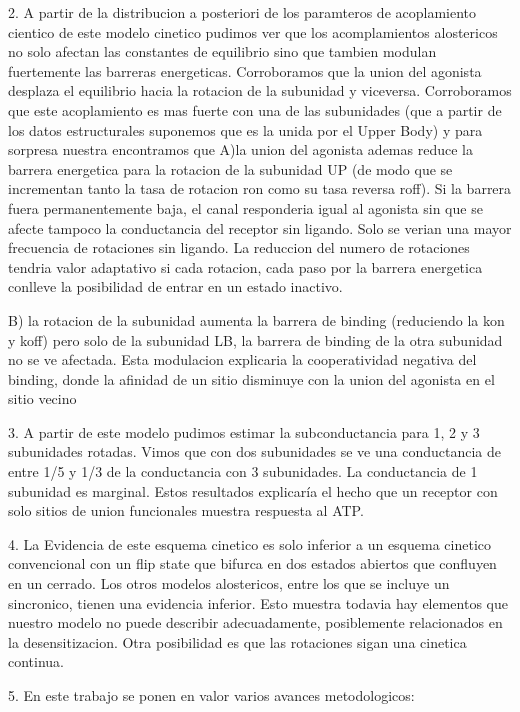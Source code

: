\documentclass[a4paper,12pt]{article}
\begin{document}
		
		
		2. A partir de la distribucion a posteriori de los paramteros de acoplamiento cientico de  este modelo cinetico pudimos ver que los acomplamientos alostericos no solo afectan las constantes de equilibrio sino que tambien modulan fuertemente las barreras energeticas. Corroboramos que la union del agonista desplaza el equilibrio hacia la rotacion de la subunidad y viceversa. Corroboramos que este acoplamiento es mas fuerte con una de las subunidades (que a partir de los datos estructurales suponemos que es la unida por el Upper Body) y para sorpresa nuestra encontramos que 
		A)la union del agonista ademas reduce la barrera energetica para la rotacion de la subunidad UP (de modo que se incrementan tanto la tasa de rotacion ron como su tasa reversa roff). 
		Si la barrera fuera permanentemente baja, el canal responderia igual al agonista sin que se afecte tampoco la conductancia del receptor sin ligando. Solo se verian una mayor frecuencia de rotaciones sin ligando. 
		La reduccion del numero de rotaciones tendria valor adaptativo si cada rotacion, cada paso por la barrera energetica conlleve la posibilidad de entrar en un estado inactivo. 
		
		
		B) la rotacion de la subunidad aumenta la barrera de binding (reduciendo la kon y koff) pero solo de la subunidad LB, la barrera de binding de la otra subunidad no se ve afectada. Esta modulacion explicaria la cooperatividad negativa del binding, donde la afinidad de un sitio disminuye con la union del agonista en el sitio vecino
		
		
		3. A partir de este modelo pudimos estimar la subconductancia para 1, 2 y 3 subunidades rotadas. Vimos que con dos subunidades se ve una conductancia de entre 1/5 y 1/3 de la conductancia con 3 subunidades. La conductancia de 1 subunidad es marginal. Estos resultados explicaría el hecho que un receptor con solo sitios de union funcionales muestra respuesta al ATP. 
		
		
		4. La Evidencia de este esquema cinetico es solo inferior a un esquema cinetico convencional con un flip state que bifurca en  dos estados abiertos que confluyen en un cerrado. Los otros modelos alostericos, entre los que se incluye un sincronico, tienen una evidencia inferior. 
		Esto muestra todavia hay elementos que nuestro modelo no puede describir adecuadamente, posiblemente relacionados en la desensitizacion. Otra posibilidad es que las rotaciones sigan una cinetica continua. 
		
		5. En este trabajo se ponen en valor varios avances metodologicos: 
		
\end{document}
